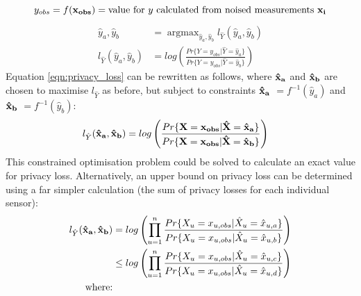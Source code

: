 \documentclass[12pt]{article}
\DeclareMathOperator*{\argmax}{argmax}
\begin{document}
\begin{appendix}
    \begin{equation}
      y_{obs} = f(\bf{x}_{obs}) = \text{value for $y$ calculated from noised measurements $\bf{x}_i$} \nonumber\\
    \end{equation}
    \begin{align}
      \hat{y}_a, \hat{y}_b & = \argmax_{\hat{y}_a, \hat{y}_b} l_{\hat{Y}}(\hat{y}_a, \hat{y}_b) \label{eqn:argmax}\\
      l_{\hat{Y}}(\hat{y}_a, \hat{y}_b) & = log \left( \frac{Pr\{ Y = y_{obs} | \hat{Y} = \hat{y}_a \}}{Pr\{ Y = y_{obs} | \hat{Y} = \hat{y}_b \}} \right) \label{eqn:privacy_loss}
    \end{align}
    Equation \ref{eqn:privacy_loss} can be rewritten as follows, where $\bf{\hat{x}_a}$ and $\bf{\hat{x}_b}$ are chosen to maximise $l_{\hat{Y}}$ as before, but subject to constraints $\bf{\hat{x}_a}$ $ = f^{-1}(\hat{y}_a)$ and $\bf{\hat{x}_b}$ $ = f^{-1}(\hat{y}_b)$:
    \begin{align}
      l_{\hat{Y}}(\bf{\hat{x}_a}, \bf{\hat{x}_b}) & = log \left( \frac{Pr\{ \bf{X} = \bf{x}_{obs} | \bf{\hat{X}} = \bf{\hat{x}_a} \}}{Pr\{ \bf{X} = \bf{x}_{obs} | \bf{\hat{X}} = \bf{\hat{x}_b} \}} \right) \label{eqn:exact_indirect_priv_loss}
    \end{align}
    This constrained optimisation problem could be solved to calculate an exact value for privacy loss. Alternatively, an upper bound on privacy loss can be determined using a far simpler calculation (the sum of privacy losses for each individual sensor):
    \begin{align}
      l_{\hat{Y}}(\bf{\hat{x}_a}, \bf{\hat{x}_b}) & = log \left( \prod_{u=1}^n \frac{Pr\{ X_u = x_{u,obs} | \hat{X}_u = \hat{x}_{u,a} \}} {Pr\{ X_u = x_{u,obs} | \hat{X}_u = \hat{x}_{u,b} \}} \right) \nonumber \\
      & \leq log \left( \prod_{u=1}^n \frac{Pr\{ X_u = x_{u,obs} | \hat{X}_u = \hat{x}_{u,c} \}}{Pr\{ X_u = x_{u,obs} | \hat{X}_u = \hat{x}_{u,d} \}} \right) \label{eqn:upper_bound} \\
      \text{where:} & \nonumber \\

\end{align}
\end{appendix}
\end{document}
